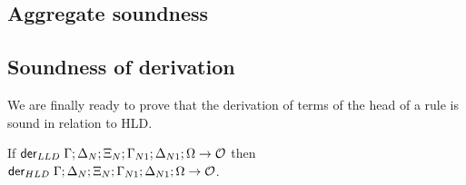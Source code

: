 

\subsection{Aggregate soundness}



\subsection{Soundness of derivation}

We are finally ready to prove that the derivation of terms of the head of a rule
is sound in relation to HLD.

\begin{lemma}\label{thm:head_derivation_soundness}
If $\mathsf{der}_{LLD} \; \Gamma; \Delta_N; \Xi_N; \Gamma_{N1}; \Delta_{N1}; \Omega \rightarrow \mathcal{O}$ then
$\mathsf{der}_{HLD} \; \Gamma; \Delta_N; \Xi_N; \Gamma_{N1}; \Delta_{N1}; \Omega \rightarrow \mathcal{O}$.
\end{lemma}

